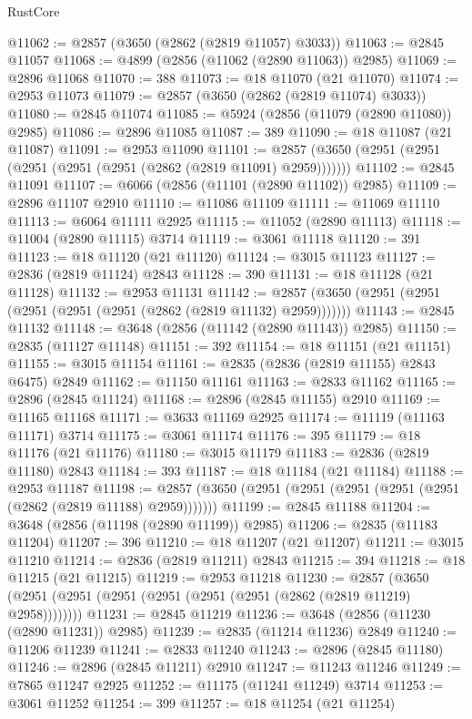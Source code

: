 \begin{lexlean}{RustCore}
\begin{coremodule}
@11062 := @2857 (@3650 (@2862 (@2819 @11057) @3033))
@11063 := @2845 @11057
@11068 := @4899 (@2856 (@11062 (@2890 @11063)) @2985)
@11069 := @2896 @11068
@11070 := 388
@11073 := @18 @11070 (@21 @11070)
@11074 := @2953 @11073
@11079 := @2857 (@3650 (@2862 (@2819 @11074) @3033))
@11080 := @2845 @11074
@11085 := @5924 (@2856 (@11079 (@2890 @11080)) @2985)
@11086 := @2896 @11085
@11087 := 389
@11090 := @18 @11087 (@21 @11087)
@11091 := @2953 @11090
@11101 := @2857 (@3650 (@2951 (@2951 (@2951 (@2951 (@2951 (@2862 (@2819 @11091) @2959)))))))
@11102 := @2845 @11091
@11107 := @6066 (@2856 (@11101 (@2890 @11102)) @2985)
@11109 := @2896 @11107 @2910
@11110 := @11086 @11109
@11111 := @11069 @11110
@11113 := @6064 @11111 @2925
@11115 := @11052 (@2890 @11113)
@11118 := @11004 (@2890 @11115) @3714
@11119 := @3061 @11118
@11120 := 391
@11123 := @18 @11120 (@21 @11120)
@11124 := @3015 @11123
@11127 := @2836 (@2819 @11124) @2843
@11128 := 390
@11131 := @18 @11128 (@21 @11128)
@11132 := @2953 @11131
@11142 := @2857 (@3650 (@2951 (@2951 (@2951 (@2951 (@2951 (@2862 (@2819 @11132) @2959)))))))
@11143 := @2845 @11132
@11148 := @3648 (@2856 (@11142 (@2890 @11143)) @2985)
@11150 := @2835 (@11127 @11148)
@11151 := 392
@11154 := @18 @11151 (@21 @11151)
@11155 := @3015 @11154
@11161 := @2835 (@2836 (@2819 @11155) @2843 @6475) @2849
@11162 := @11150 @11161
@11163 := @2833 @11162
@11165 := @2896 (@2845 @11124)
@11168 := @2896 (@2845 @11155) @2910
@11169 := @11165 @11168
@11171 := @3633 @11169 @2925
@11174 := @11119 (@11163 @11171) @3714
@11175 := @3061 @11174
@11176 := 395
@11179 := @18 @11176 (@21 @11176)
@11180 := @3015 @11179
@11183 := @2836 (@2819 @11180) @2843
@11184 := 393
@11187 := @18 @11184 (@21 @11184)
@11188 := @2953 @11187
@11198 := @2857 (@3650 (@2951 (@2951 (@2951 (@2951 (@2951 (@2862 (@2819 @11188) @2959)))))))
@11199 := @2845 @11188
@11204 := @3648 (@2856 (@11198 (@2890 @11199)) @2985)
@11206 := @2835 (@11183 @11204)
@11207 := 396
@11210 := @18 @11207 (@21 @11207)
@11211 := @3015 @11210
@11214 := @2836 (@2819 @11211) @2843
@11215 := 394
@11218 := @18 @11215 (@21 @11215)
@11219 := @2953 @11218
@11230 := @2857 (@3650 (@2951 (@2951 (@2951 (@2951 (@2951 (@2951 (@2862 (@2819 @11219) @2958))))))))
@11231 := @2845 @11219
@11236 := @3648 (@2856 (@11230 (@2890 @11231)) @2985)
@11239 := @2835 (@11214 @11236) @2849
@11240 := @11206 @11239
@11241 := @2833 @11240
@11243 := @2896 (@2845 @11180)
@11246 := @2896 (@2845 @11211) @2910
@11247 := @11243 @11246
@11249 := @7865 @11247 @2925
@11252 := @11175 (@11241 @11249) @3714
@11253 := @3061 @11252
@11254 := 399
@11257 := @18 @11254 (@21 @11254)

\end{coremodule}
\end{lexlean}
